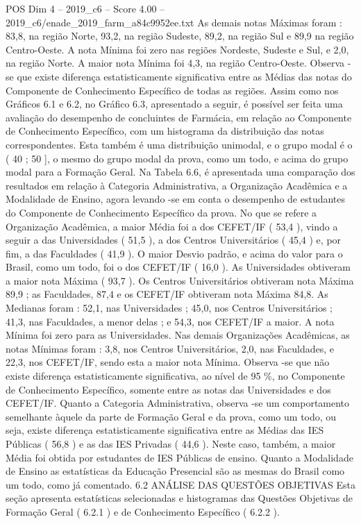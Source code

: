 \begin{textsample}{POS Dim 4 – 2019\_c6 – Score 4.00 – 2019\_c6/enade\_2019\_farm\_a84c9952ee.txt}
As demais notas Máximas foram : 83,8, na região Norte, 93,2, na região Sudeste, 89,2, na região Sul e 89,9 na região Centro-Oeste.
A nota Mínima foi zero nas regiões Nordeste, Sudeste e Sul, e 2,0, na região Norte.
A maior nota Mínima foi 4,3, na região Centro-Oeste.
Observa -se que existe diferença estatisticamente significativa entre as Médias das notas do Componente de Conhecimento Específico de todas as regiões.
Assim como nos Gráficos 6.1 e 6.2, no Gráfico 6.3, apresentado a seguir, é possível ser feita uma avaliação do desempenho de concluintes de Farmácia, em relação ao Componente de Conhecimento Específico, com um histograma da distribuição das notas correspondentes.
Esta também é uma distribuição unimodal, e o grupo modal é o ( 40 ; 50 ], o mesmo do grupo modal da prova, como um todo, e acima do grupo modal para a Formação Geral.
Na Tabela 6.6, é apresentada uma comparação dos resultados em relação à Categoria Administrativa, a Organização Acadêmica e a Modalidade de Ensino, agora levando -se em conta o desempenho de estudantes do Componente de Conhecimento Específico da prova.
No que se refere a Organização Acadêmica, a maior Média foi a dos CEFET/IF ( 53,4 ), vindo a seguir a das Universidades ( 51,5 ), a dos Centros Universitários ( 45,4 ) e, por fim, a das Faculdades ( 41,9 ).
O maior Desvio padrão, e acima do valor para o Brasil, como um todo, foi o dos CEFET/IF ( 16,0 ).
As Universidades obtiveram a maior nota Máxima ( 93,7 ).
Os Centros Universitários obtiveram nota Máxima 89,9 ; as Faculdades, 87,4 e os CEFET/IF obtiveram nota Máxima 84,8.
As Medianas foram : 52,1, nas Universidades ; 45,0, nos Centros Universitários ; 41,3, nas Faculdades, a menor delas ; e 54,3, nos CEFET/IF a maior.
A nota Mínima foi zero para as Universidades.
Nas demais Organizações Acadêmicas, as notas Mínimas foram : 3,8, nos Centros Universitários, 2,0, nas Faculdades, e 22,3, nos CEFET/IF, sendo esta a maior nota Mínima.
Observa -se que não existe diferença estatisticamente significativa, ao nível de 95 \%, no Componente de Conhecimento Específico, somente entre as notas das Universidades e dos CEFET/IF.
Quanto a Categoria Administrativa, observa -se um comportamento semelhante àquele da parte de Formação Geral e da prova, como um todo, ou seja, existe diferença estatisticamente significativa entre as Médias das IES Públicas ( 56,8 ) e as das IES Privadas ( 44,6 ).
Neste caso, também, a maior Média foi obtida por estudantes de IES Públicas de ensino.
Quanto a Modalidade de Ensino as estatísticas da Educação Presencial são as mesmas do Brasil como um todo, como já comentado. 6.2 ANÁLISE DAS QUESTÕES OBJETIVAS Esta seção apresenta estatísticas selecionadas e histogramas das Questões Objetivas de Formação Geral ( 6.2.1 ) e de Conhecimento Específico ( 6.2.2 ).

\end{textsample}
